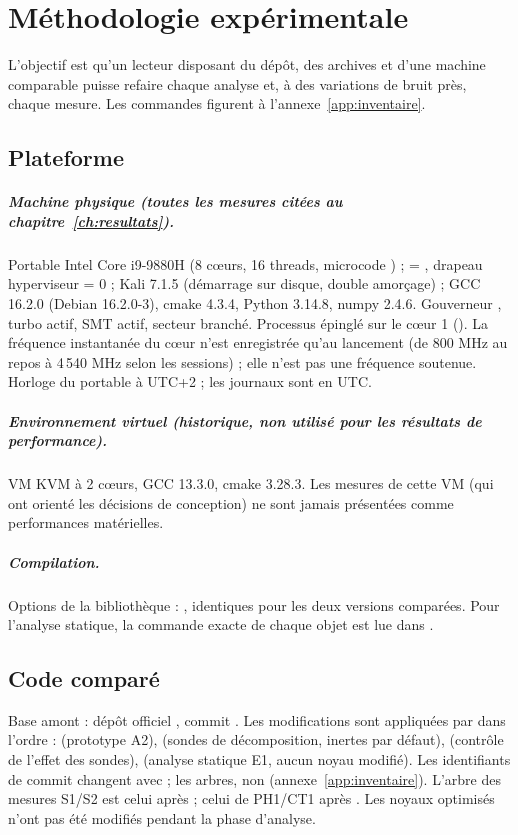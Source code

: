 \chapter{Méthodologie expérimentale}
\label{ch:methodo}

L'objectif est qu'un lecteur disposant du dépôt, des archives et d'une machine comparable puisse refaire chaque analyse et, à des variations de bruit près, chaque mesure. Les commandes figurent à l'annexe~\ref{app:inventaire}.

\section{Plateforme}
\paragraph{Machine physique (toutes les mesures citées au chapitre~\ref{ch:resultats}).} Portable Intel Core i9-9880H (8 cœurs, 16 threads, microcode ) ;  = , drapeau hyperviseur = 0 ; Kali 7.1.5 (démarrage sur disque, double amorçage) ; GCC 16.2.0 (Debian 16.2.0-3), cmake 4.3.4, Python 3.14.8, numpy 2.4.6. Gouverneur , turbo actif, SMT actif, secteur branché. Processus épinglé sur le cœur 1 (). La fréquence instantanée du cœur n'est enregistrée qu'au lancement (de 800 MHz au repos à 4\,540 MHz selon les sessions) ; elle n'est pas une fréquence soutenue. Horloge du portable à UTC+2 ; les journaux  sont en UTC.

\paragraph{Environnement virtuel (historique, non utilisé pour les résultats de performance).} VM KVM à 2 cœurs, GCC 13.3.0, cmake 3.28.3. Les mesures de cette VM (qui ont orienté les décisions de conception) ne sont jamais présentées comme performances matérielles.

\paragraph{Compilation.} Options de la bibliothèque : , identiques pour les deux versions comparées. Pour l'analyse statique, la commande exacte de chaque objet est lue dans .

\section{Code comparé}
Base amont : dépôt officiel , commit . Les modifications sont appliquées par  dans l'ordre :  (prototype A2),  (sondes de décomposition, inertes par défaut),  (contrôle de l'effet des sondes),  (analyse statique E1, aucun noyau modifié). Les identifiants de commit changent avec  ; les arbres, non (annexe~\ref{app:inventaire}). L'arbre des mesures S1/S2 est celui après  ; celui de PH1/CT1 après . Les noyaux optimisés n'ont pas été modifiés pendant la phase d'analyse.

